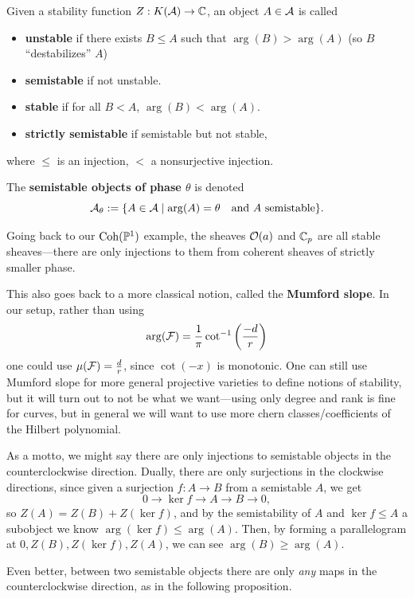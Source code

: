 \documentclass[12pt]{article}
\begin{document}
\begin{defn}
    Given a stability function $Z: K(\mathcal{A}) \to \mathbb{C}$, an object $A\in \mathcal{A}$ is called
    \begin{itemize}
        \item \textbf{unstable} if there exists $B\leq A$ such that $\arg(B) > \arg(A)$ (so $B$ ``destabilizes'' $A$)
        \item \textbf{semistable} if not unstable.
        \item \textbf{stable} if for all $B<A$, $\arg(B) < \arg(A)$.
        \item \textbf{strictly semistable} if semistable but not stable,
    \end{itemize}
    where $\leq$ is an injection, $<$ a nonsurjective injection.

    The \textbf{semistable objects of phase $\theta$} is denoted
    \[\mathcal{A}_{\theta} := \{A\in \mathcal{A} \mid \arg(A)=\theta \quad \text{and $A$ semistable}\}.\]
\end{defn}

\begin{eg}
    Going back to our $\operatorname{Coh}(\mathbb{P}^1)$ example, the sheaves $\mathcal{O}(a)$ and $\mathbb{C}_p$ are all stable sheaves---there are only injections to them from coherent sheaves of strictly smaller phase.

    This also goes back to a more classical notion, called the \textbf{Mumford slope}. In our setup, rather than using
    \[\arg(\mathcal{F}) = \frac{1}{\pi}\cot^{-1}\left(\frac{-d}{r}\right)\]
    one could use $\mu(\mathcal{F}) = \frac{d}{r}$, since $\cot(-x)$ is monotonic. One can still use Mumford slope for more general projective varieties to define notions of stability, but it will turn out to not be what we want---using only degree and rank is fine for curves, but in general we will want to use more chern classes/coefficients of the Hilbert polynomial.
\end{eg}

\begin{rmk}
    As a motto, we might say there are only injections to semistable objects in the counterclockwise direction. Dually, there are only surjections in the clockwise directions, since given a surjection $f:A\to B$ from a semistable $A$, we get
    \[0 \to \ker f \to A \to B \to 0,\]
    so $Z(A) = Z(B) + Z(\ker f)$, and by the semistability of $A$ and $\ker f\leq A$ a subobject we know $\arg(\ker f) \leq \arg(A)$. Then, by forming a parallelogram at $0,Z(B),Z(\ker f),Z(A)$, we can see $\arg(B) \geq \arg(A)$.
    
    Even better, between two semistable objects there are only \textit{any} maps in the counterclockwise direction, as in the following proposition.
\end{rmk}
\end{document}
